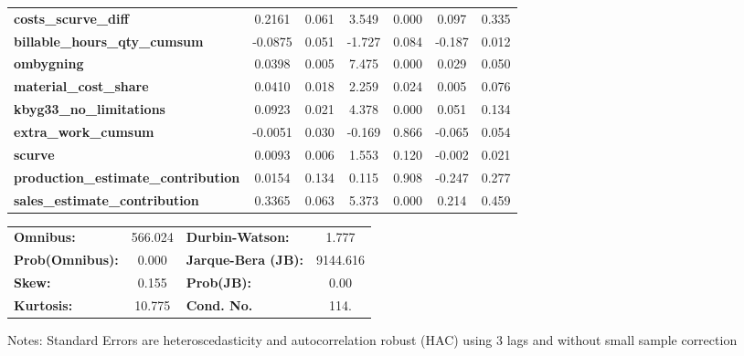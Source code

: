 \begin{center}
\begin{tabular}{lcccccc}
\textbf{costs\_scurve\_diff}                &       0.2161  &        0.061     &     3.549  &         0.000        &        0.097    &        0.335     \\
\textbf{billable\_hours\_qty\_cumsum}       &      -0.0875  &        0.051     &    -1.727  &         0.084        &       -0.187    &        0.012     \\
\textbf{ombygning}                          &       0.0398  &        0.005     &     7.475  &         0.000        &        0.029    &        0.050     \\
\textbf{material\_cost\_share}              &       0.0410  &        0.018     &     2.259  &         0.024        &        0.005    &        0.076     \\
\textbf{kbyg33\_no\_limitations}            &       0.0923  &        0.021     &     4.378  &         0.000        &        0.051    &        0.134     \\
\textbf{extra\_work\_cumsum}                &      -0.0051  &        0.030     &    -0.169  &         0.866        &       -0.065    &        0.054     \\
\textbf{scurve}                             &       0.0093  &        0.006     &     1.553  &         0.120        &       -0.002    &        0.021     \\
\textbf{production\_estimate\_contribution} &       0.0154  &        0.134     &     0.115  &         0.908        &       -0.247    &        0.277     \\
\textbf{sales\_estimate\_contribution}      &       0.3365  &        0.063     &     5.373  &         0.000        &        0.214    &        0.459     \\
\bottomrule
\end{tabular}
\begin{tabular}{lclc}
\textbf{Omnibus:}       & 566.024 & \textbf{  Durbin-Watson:     } &    1.777  \\
\textbf{Prob(Omnibus):} &   0.000 & \textbf{  Jarque-Bera (JB):  } & 9144.616  \\
\textbf{Skew:}          &   0.155 & \textbf{  Prob(JB):          } &     0.00  \\
\textbf{Kurtosis:}      &  10.775 & \textbf{  Cond. No.          } &     114.  \\
\bottomrule
\end{tabular}
\end{center}

Notes: \newline
 [1] Standard Errors are heteroscedasticity and autocorrelation robust (HAC) using 3 lags and without small sample correction